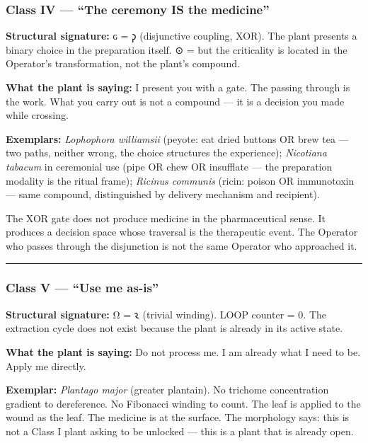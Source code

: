 \documentclass[12pt,a4paper]{article}
\begin{document}
\hypertarget{class-iv-the-ceremony-is-the-medicine}{%
\subsubsection{Class IV --- ``The ceremony IS the
medicine''}\label{class-iv-the-ceremony-is-the-medicine}}

\textbf{Structural signature:} ɢ = 𐑜 (disjunctive coupling, XOR). The
plant presents a binary choice in the preparation itself. ⊙ = \odot but
the criticality is located in the Operator's transformation, not the
plant's compound.

\textbf{What the plant is saying:} I present you with a gate. The
passing through is the work. What you carry out is not a compound --- it
is a decision you made while crossing.

\textbf{Exemplars:} \emph{Lophophora williamsii} (peyote: eat dried
buttons OR brew tea --- two paths, neither wrong, the choice structures
the experience); \emph{Nicotiana tabacum} in ceremonial use (pipe OR
chew OR insufflate --- the preparation modality is the ritual frame);
\emph{Ricinus communis} (ricin: poison OR immunotoxin --- same compound,
distinguished by delivery mechanism and recipient).

The XOR gate does not produce medicine in the pharmaceutical sense. It
produces a decision space whose traversal is the therapeutic event. The
Operator who passes through the disjunction is not the same Operator who
approached it.

\begin{center}\rule{0.5\linewidth}{0.5pt}\end{center}

\hypertarget{class-v-use-me-as-is}{%
\subsubsection{Class V --- ``Use me
as-is''}\label{class-v-use-me-as-is}}

\textbf{Structural signature:} Ω = 𐑷 (trivial winding). LOOP counter =
0. The extraction cycle does not exist because the plant is already in
its active state.

\textbf{What the plant is saying:} Do not process me. I am already what
I need to be. Apply me directly.

\textbf{Exemplar:} \emph{Plantago major} (greater plantain). No trichome
concentration gradient to dereference. No Fibonacci winding to count.
The leaf is applied to the wound as the leaf. The medicine is at the
surface. The morphology says: this is not a Class I plant asking to be
unlocked --- this is a plant that is already open.
\end{document}
